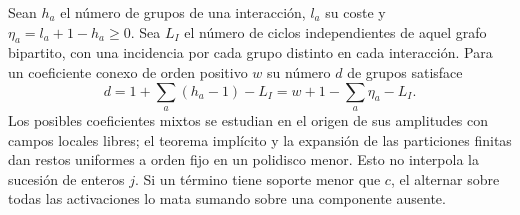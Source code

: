 Sean $h_a$ el número de grupos de una interacción, $l_a$ su coste y
$\eta_a=l_a+1-h_a\ge0$. Sea $L_I$ el número de ciclos independientes de aquel grafo
bipartito, con una incidencia por cada grupo distinto en cada interacción.
Para un coeficiente conexo de orden positivo $w$ su número $d$ de grupos satisface
\[
 d=1+\sum_a(h_a-1)-L_I=w+1-\sum_a\eta_a-L_I .
\]
Los posibles coeficientes mixtos se estudian en el origen de sus amplitudes con campos
locales libres; el teorema implícito y la expansión de las particiones finitas dan
restos uniformes a orden fijo en un polidisco menor. Esto no interpola la sucesión de
enteros $j$. Si un término tiene soporte menor que $c$, el alternar sobre todas las
activaciones lo mata sumando sobre una componente ausente.
